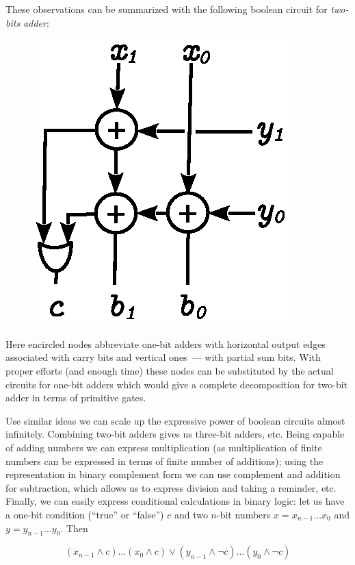 These observations can be summarized with the following boolean circuit for \emph{two-bits adder}:

\begin{figure}[h]
  \centering
  \includegraphics[scale=0.7]{images/06-05.eps}
\end{figure}

Here encircled nodes abbreviate one-bit adders with horizontal output edges associated with carry bits and
vertical ones~--- with partial sum bits. With proper efforts (and enough time) these nodes can be substituted
by the actual circuits for one-bit adders which would give a complete decomposition for two-bit adder in terms of
primitive gates.

Use similar ideas we can scale up the expressive power of boolean circuits almost infinitely. Combining two-bit adders
gives us three-bit adders, etc. Being capable of adding numbers we can express multiplication (as multiplication of
finite numbers can be expressed in terms of finite number of additions); using the representation in binary complement
form we can use complement and addition for subtraction, which allows us to express division and taking a reminder, etc.
Finally, we can easily express conditional calculations in binary logic: let us have a one-bit condition (``true'' or ``false'') $c$ and
two $n$-bit numbers $x=x_{n-1}\dots x_0$ and $y=y_{n-1}\dots y_0$. Then

\[
(x_{n-1}\wedge c)\dots(x_0\wedge c) \vee (y_{n-1}\wedge \neg c)\dots(y_0\wedge \neg c) 
\]

